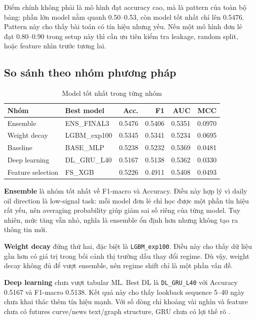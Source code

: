 \documentclass[10pt,a4paper]{article}
\newcommand{\code}[1]{\texttt{#1}}
\begin{document}
Điểm chính không phải là mô hình đạt accuracy cao, mà là pattern của toàn bộ bảng: phần lớn model nằm quanh 0.50--0.53, còn model tốt nhất chỉ lên 0.5476. Pattern này cho thấy bài toán có tín hiệu nhưng yếu. Nếu một mô hình đơn lẻ đạt 0.80--0.90 trong setup này thì cần ưu tiên kiểm tra leakage, random split, hoặc feature nhìn trước tương lai.

\subsection{So sánh theo nhóm phương pháp}

\begin{table}[!htbp]
\centering
\caption{Model tốt nhất trong từng nhóm}
\small
\begin{tabular}{llrrrr}
\toprule
\textbf{Nhóm} & \textbf{Best model} & \textbf{Acc.} & \textbf{F1} & \textbf{AUC} & \textbf{MCC} \\
\midrule
Ensemble & ENS\_FINAL3 & 0.5476 & 0.5406 & 0.5351 & 0.0970 \\
Weight decay & LGBM\_exp100 & 0.5345 & 0.5341 & 0.5234 & 0.0695 \\
Baseline & BASE\_MLP & 0.5238 & 0.5232 & 0.5369 & 0.0481 \\
Deep learning & DL\_GRU\_L40 & 0.5167 & 0.5138 & 0.5362 & 0.0330 \\
Feature selection & FS\_XGB & 0.5226 & 0.4911 & 0.5408 & 0.0493 \\
\bottomrule
\end{tabular}
\end{table}

\textbf{Ensemble} là nhóm tốt nhất về F1-macro và Accuracy. Điều này hợp lý vì daily oil direction là low-signal task: mỗi model đơn lẻ chỉ học được một phần tín hiệu rất yếu, nên averaging probability giúp giảm sai số riêng của từng model. Tuy nhiên, mức tăng vẫn nhỏ, nghĩa là ensemble ổn định hơn nhưng không tạo ra thông tin mới.

\textbf{Weight decay} đứng thứ hai, đặc biệt là \code{LGBM\_exp100}. Điều này cho thấy dữ liệu gần hơn có giá trị trong bối cảnh thị trường dầu thay đổi regime. Dù vậy, weight decay không đủ để vượt ensemble, nên regime shift chỉ là một phần vấn đề.

\textbf{Deep learning} chưa vượt tabular ML. Best DL là \code{DL\_GRU\_L40} với Accuracy 0.5167 và F1-macro 0.5138. Kết quả này cho thấy lookback sequence 5--40 ngày chưa khai thác thêm tín hiệu mạnh. Với số dòng chỉ khoảng vài nghìn và feature chưa có futures curve/news text/graph structure, GRU chưa có lợi thế rõ \cite{cho2014}.
\end{document}
